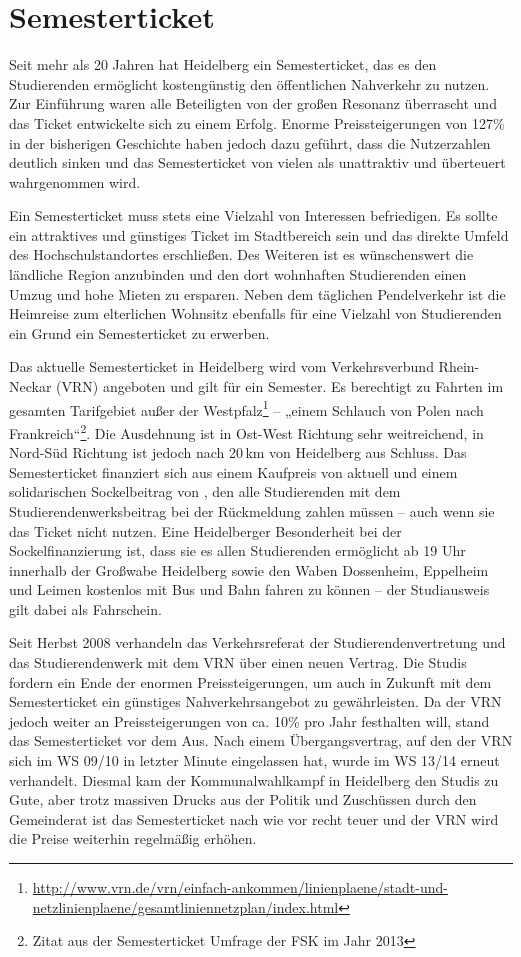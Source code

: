 
\section{Semesterticket}
Seit mehr als 20 Jahren hat Heidelberg ein Semesterticket, das es den Studierenden ermöglicht kostengünstig den öffentlichen Nahverkehr zu nutzen. Zur Einführung waren alle Beteiligten von der großen Resonanz überrascht und das Ticket entwickelte sich zu einem Erfolg. Enorme Preissteigerungen von 127\% in der bisherigen Geschichte haben jedoch dazu geführt, dass die Nutzerzahlen deutlich sinken und das Semesterticket von vielen als unattraktiv und überteuert wahrgenommen wird.

Ein Semesterticket muss stets eine Vielzahl von Interessen befriedigen. Es sollte ein attraktives und günstiges Ticket im Stadtbereich sein und das direkte Umfeld des Hochschulstandortes erschließen. Des Weiteren ist es wünschenswert die ländliche Region anzubinden und den dort wohnhaften Studierenden einen Umzug und hohe Mieten zu ersparen. Neben dem täglichen Pendelverkehr ist die Heimreise zum elterlichen Wohnsitz ebenfalls für eine Vielzahl von Studierenden ein Grund ein Semesterticket zu erwerben.

Das aktuelle Semesterticket in Heidelberg wird vom Verkehrsverbund Rhein-Neckar (VRN) angeboten und gilt für ein Semester. Es berechtigt zu Fahrten im gesamten Tarifgebiet außer der Westpfalz\footnote{\url{http://www.vrn.de/vrn/einfach-ankommen/linienplaene/stadt-und-netzlinienplaene/gesamtliniennetzplan/index.html}} -- „einem Schlauch von Polen nach Frankreich“\footnote{Zitat aus der Semesterticket Umfrage der FSK im Jahr 2013}. Die Ausdehnung ist in Ost-West Richtung sehr weitreichend, in Nord-Süd Richtung ist jedoch nach 20\,km von Heidelberg aus Schluss. Das Semesterticket finanziert sich aus einem Kaufpreis von aktuell \EUR{\semesterticket} und einem solidarischen Sockelbeitrag von \EUR{\sockelbeitrag}, den alle Studierenden mit dem Studierendenwerksbeitrag bei der Rückmeldung zahlen müssen -- auch wenn sie das Ticket nicht nutzen. Eine Heidelberger Besonderheit bei der Sockelfinanzierung ist, dass sie es allen Studierenden ermöglicht ab 19 Uhr innerhalb der Großwabe Heidelberg sowie den Waben Dossenheim, Eppelheim und Leimen kostenlos mit Bus und Bahn fahren zu können -- der Studiausweis gilt dabei als Fahrschein.

Seit Herbst 2008 verhandeln das Verkehrsreferat der Studierendenvertretung und das Studierendenwerk mit dem VRN über einen neuen Vertrag. Die Studis fordern ein Ende der enormen Preissteigerungen, um auch in Zukunft mit dem Semesterticket ein günstiges Nahverkehrsangebot zu gewährleisten. Da der VRN jedoch weiter an Preissteigerungen von ca. 10\% pro Jahr festhalten will, stand das Semesterticket vor dem Aus. Nach einem Übergangsvertrag, auf den der VRN sich im WS 09/10 in letzter Minute eingelassen hat, wurde im WS 13/14 erneut verhandelt. Diesmal kam der Kommunalwahlkampf in Heidelberg den Studis zu Gute, aber trotz massiven Drucks aus der Politik und Zuschüssen durch den Gemeinderat ist das Semesterticket nach wie vor recht teuer und der VRN wird die Preise weiterhin regelmäßig erhöhen.


